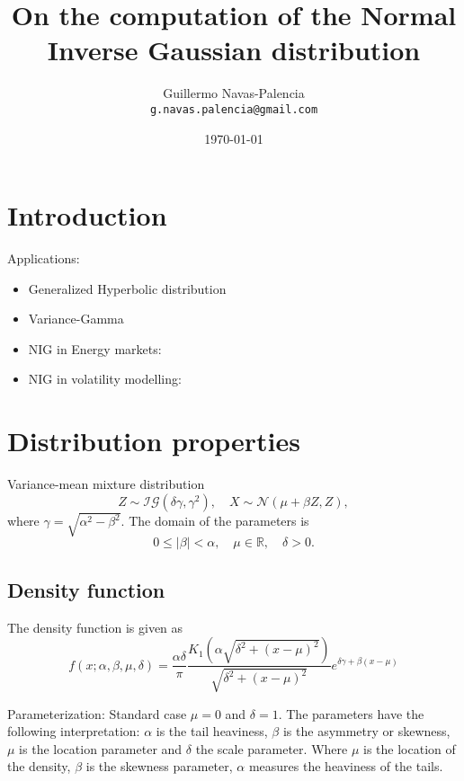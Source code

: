 \documentclass[10pt,a4paper,oneside]{article}
\title{On the computation of the Normal Inverse Gaussian distribution}
\author{
 \normalsize  Guillermo Navas-Palencia\\
  \texttt{\normalsize  g.navas.palencia@gmail.com}
}
\date{\small \today}
\numberwithin{equation}{section}
\begin{document}
\maketitle

\section{Introduction}

Applications:
\begin{itemize}
\item Generalized Hyperbolic distribution \cite{Prause1999}
\item Variance-Gamma \cite{Madan1990}
\item NIG in Energy markets: \cite{Benth2004}
\item NIG in volatility modelling: \cite{Barndorff1997}
\end{itemize}

\section{Distribution properties}

Variance-mean mixture distribution
\begin{equation}
Z \sim \mathcal{IG}(\delta \gamma, \gamma^2), \quad X \sim \mathcal{N}(\mu + \beta Z, Z),
\end{equation}
where $\gamma = \sqrt{\alpha^2 - \beta^2}$. The domain of the parameters is
\begin{equation}
0 \le |\beta| < \alpha, \quad \mu \in \mathbb{R}, \quad \delta  > 0.
\end{equation}

\subsection{Density function}
The density function is given as
\begin{equation}
f(x; \alpha, \beta, \mu, \delta) = \frac{\alpha \delta}{\pi} \frac{K_1\left(\alpha\sqrt{\delta^2 + (x-\mu)^2}\right)}{\sqrt{\delta^2 + (x-\mu)^2}} e^{\delta \gamma + \beta(x-\mu)}
\end{equation}

Parameterization: Standard case $\mu = 0$ and $\delta = 1$. The parameters have the following interpretation: $\alpha$ is the tail heaviness, $\beta$ is the asymmetry or skewness, $\mu$ is the location parameter and $\delta$ the scale parameter. Where $\mu$ is the location of the density, $\beta$ is the skewness parameter, $\alpha$ measures the heaviness of the tails.
\end{document}
